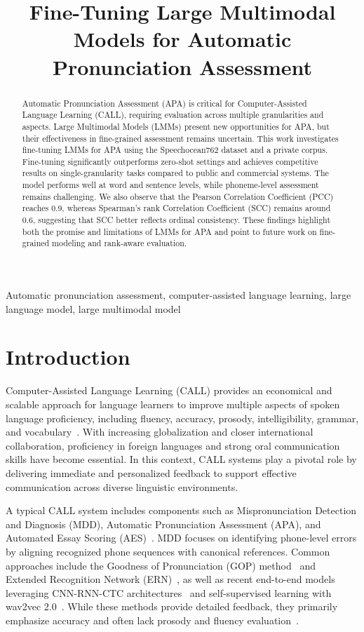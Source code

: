 \documentclass{article}
\title{Fine-Tuning Large Multimodal Models for Automatic Pronunciation Assessment}
\begin{document}
%
\maketitle
%
\begin{abstract}
Automatic Pronunciation Assessment (APA) is critical for Computer-Assisted Language Learning (CALL), requiring evaluation across multiple granularities and aspects. Large Multimodal Models (LMMs) present new opportunities for APA, but their effectiveness in fine-grained assessment remains uncertain. This work investigates fine-tuning LMMs for APA using the Speechocean762 dataset and a private corpus. Fine-tuning significantly outperforms zero-shot settings and achieves competitive results on single-granularity tasks compared to public and commercial systems. The model performs well at word and sentence levels, while phoneme-level assessment remains challenging. We also observe that the Pearson Correlation Coefficient (PCC) reaches 0.9, whereas Spearman’s rank Correlation Coefficient (SCC) remains around 0.6, suggesting that SCC better reflects ordinal consistency. These findings highlight both the promise and limitations of LMMs for APA and point to future work on fine-grained modeling and rank-aware evaluation.
\end{abstract}
%
\begin{keywords}
Automatic pronunciation assessment, computer-assisted language learning, large language model,
large multimodal model
\end{keywords}
%
\section{Introduction}
\label{sec:intro}

Computer-Assisted Language Learning (CALL) provides an economical and scalable approach for language learners to improve multiple aspects of spoken language proficiency, including fluency, accuracy, prosody, intelligibility, grammar, and vocabulary~\cite{Kheir2023PA}. With increasing globalization and closer international collaboration, proficiency in foreign languages and strong oral communication skills have become essential. In this context, CALL systems play a pivotal role by delivering immediate and personalized feedback to support effective communication across diverse linguistic environments.

A typical CALL system includes components such as Mispronunciation Detection and Diagnosis (MDD), Automatic Pronunciation Assessment (APA), and Automated Essay Scoring (AES)~\cite{Ye2022Approach,Wu2024Prompting,Mao2019OR,Lin2020PA,Gong2022GOPT,Chao20233MH,Fu2024LLM,Wang2025Exploring}. MDD focuses on identifying phone-level errors by aligning recognized phone sequences with canonical references. Common approaches include the Goodness of Pronunciation (GOP) method~\cite{Witt2000Phone,Hu2015Improved} and Extended Recognition Network (ERN)~\cite{Qian2010Capturing,Li2016Tone}, as well as recent end-to-end models leveraging CNN-RNN-CTC architectures~\cite{Leung2019CNN} and self-supervised learning with wav2vec 2.0~\cite{Xu2021Explore}. While these methods provide detailed feedback, they primarily emphasize accuracy and often lack prosody and fluency evaluation~\cite{Gong2022GOPT,Wang2023Assessing}.
\end{document}
